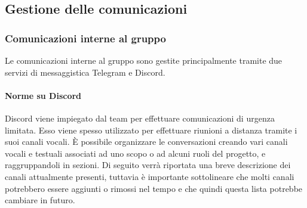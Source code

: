 \subsection{Gestione delle comunicazioni}
\subsubsection{Comunicazioni interne al gruppo}
Le comunicazioni interne al gruppo sono gestite principalmente tramite due servizi di messaggistica Telegram e Discord.
\paragraph{Norme su Discord}\Spazio
 Discord viene impiegato dal team per effettuare comunicazioni di urgenza limitata. Esso viene spesso utilizzato per effettuare riunioni a distanza tramite i suoi canali vocali. 
 È possibile organizzare le conversazioni creando vari canali vocali e testuali associati ad uno scopo o ad alcuni ruoli del progetto, e raggruppandoli in sezioni. Di seguito verrà riportata una breve descrizione dei canali attualmente presenti, tuttavia è importante sottolineare che molti canali potrebbero essere aggiunti o rimossi nel tempo e che quindi questa lista potrebbe cambiare in futuro.\newline
